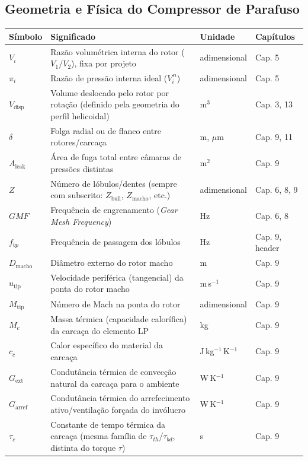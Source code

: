 \documentclass[12pt,a4paper]{article}
\numberwithin{equation}{section}
\numberwithin{table}{section}
\numberwithin{figure}{section}
\begin{document}
{{\subsection*{Geometria e Física do Compressor de Parafuso}
\begin{longtable}{>{\raggedright\arraybackslash}p{2.8cm} >{\raggedright\arraybackslash}p{5.3cm} >{\raggedright\arraybackslash}p{2.1cm} >{\raggedright\arraybackslash}p{4.2cm}}
	\toprule
	\textbf{Símbolo} & \textbf{Significado} & \textbf{Unidade} & \textbf{Capítulos} \\ \midrule
	\endhead
	$V_i$ & Razão volumétrica interna do rotor ($V_1/V_2$), fixa por projeto & adimensional & Cap. 5 \\
	$\pi_i$ & Razão de pressão interna ideal ($V_i^{\,n}$) & adimensional & Cap. 5 \\
	$V_{\text{disp}}$ & Volume deslocado pelo rotor por rotação (definido pela geometria do perfil helicoidal) & m$^3$ & Cap. 3, 13 \\
	$\delta$ & Folga radial ou de flanco entre rotores/carcaça & m, $\mu$m & Cap. 9, 11 \\
	$A_{\text{leak}}$ & Área de fuga total entre câmaras de pressões distintas & m$^2$ & Cap. 9 \\
	$Z$ & Número de lóbulos/dentes (sempre com subscrito: $Z_{\text{bull}}$, $Z_{\text{macho}}$, etc.) & adimensional & Cap. 6, 8, 9 \\
	$GMF$ & Frequência de engrenamento (\textit{Gear Mesh Frequency}) & Hz & Cap. 6, 8 \\
	$f_{bp}$ & Frequência de passagem dos lóbulos & Hz & Cap. 9, header \\
	$D_{\text{macho}}$ & Diâmetro externo do rotor macho & m & Cap. 9 \\
	$u_{\text{tip}}$ & Velocidade periférica (tangencial) da ponta do rotor macho & m\,s$^{-1}$ & Cap. 9 \\
	$M_{\text{tip}}$ & Número de Mach na ponta do rotor & adimensional & Cap. 9 \\
	$M_c$ & Massa térmica (capacidade calorífica) da carcaça do elemento LP & kg & Cap. 9 \\
	$c_c$ & Calor específico do material da carcaça & J\,kg$^{-1}$\,K$^{-1}$ & Cap. 9 \\
	$G_{\text{ext}}$\dag & Condutância térmica de convecção natural da carcaça para o ambiente & W\,K$^{-1}$ & Cap. 9 \\
	$G_{\text{arref}}$\dag & Condutância térmica do arrefecimento ativo/ventilação forçada do invólucro & W\,K$^{-1}$ & Cap. 9 \\
	$\tau_c$\dag & Constante de tempo térmica da carcaça (mesma família de $\tau_{th}$/$\tau_{bd}$, distinta do torque $\tau$) & s & Cap. 9 \\ \bottomrule
\end{longtable}

}}
\end{document}

